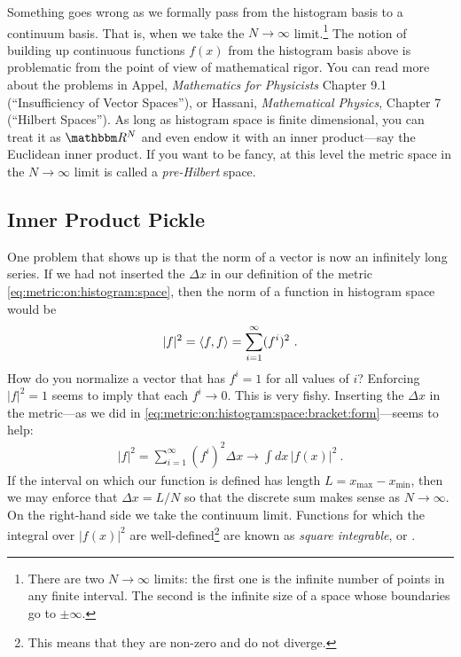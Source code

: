 \documentclass[12pt, oneside]{report}    %
\begin{document}
Something goes wrong as we formally pass from the histogram basis to a continuum basis. That is, when we take the $N\to \infty$ limit.\footnote{There are two $N\to \infty$ limits: the first one is the infinite number of points in any finite interval. The second is the infinite size of a space whose boundaries go to $\pm\infty$. } The notion of building up continuous functions $f(x)$ from the histogram basis above is problematic from the point of view of mathematical rigor. You can read more about the problems in Appel, \emph{Mathematics for Physicists} Chapter 9.1 (``Insufficiency of Vector Spaces''), or Hassani, \emph{Mathematical Physics}, Chapter 7 (``Hilbert Spaces''). As long as histogram space is finite dimensional, you can treat it as $\RR^N$ and even endow it with an inner product---say the Euclidean inner product. If you want to be fancy, at this level the metric space in the $N\to\infty$ limit is called a \emph{pre-Hilbert} space. 


\subsection{Inner Product Pickle}

One problem that shows up is that the norm of a vector is now an infinitely long series. If we had not inserted the $\Delta x$ in our definition of the metric \eqref{eq:metric:on:histogram:space}, then the norm of a function in histogram space would be
\begin{align}
    |f|^2 = \langle f, f \rangle = \sum_{i=1}^\infty (f^i)^2 \ .
    \label{eq:norm:in:function:space:no:dx}
\end{align}
How do you normalize a vector that has $f^i = 1$ for all values of $i$? Enforcing $|f|^2 = 1$ seems to imply that each $f^i \to 0$. This is very fishy.  Inserting the $\Delta x$ in the metric---as we did in \eqref{eq:metric:on:histogram:space:bracket:form}---seems to help:
\begin{align}
    |f|^2 = \sum_{i=1}^\infty (f^i)^2 \Delta x \to \int dx\, |f(x)|^2 \ .
    \label{eq:norm:in:function:space}
\end{align}
If the interval on which our function is defined has length $L = x_\text{max}- x_\text{min}$, then we may enforce that $\Delta x = L/N$ so that the discrete sum makes sense as $N\to\infty$. On the right-hand side we take the continuum limit. Functions for which the integral over $|f(x)|^2$ are well-defined\footnote{This means that they are non-zero and do not diverge.} are known as \emph{square integrable}, or . 
\end{document}
